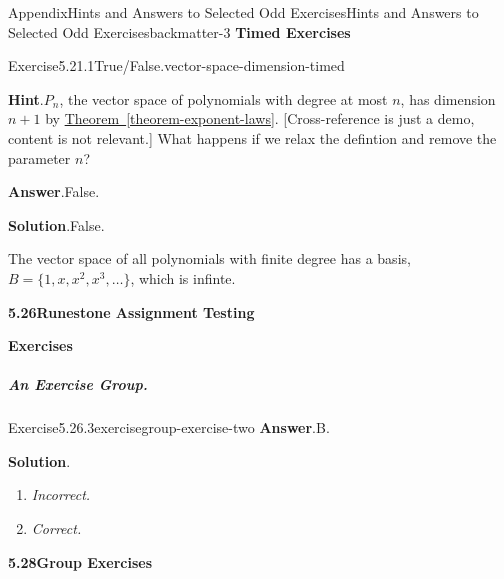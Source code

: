 \documentclass[oneside,10pt,]{book}
\newcommand{\blocktitlefont}{\relax}
\newcommand{\xreffont}{\relax}
\newcommand{\lititle}[1]{{\slshape#1}}
\numberwithin{equation}{section}
\begin{document}
\begin{solutions-chapter}{Appendix}{Hints and Answers to Selected Odd Exercises}{}{Hints and Answers to Selected Odd Exercises}{}{}{backmatter-3}
\noindent\textbf{\large{}\textperiodcentered\space{}Timed Exercises}
\begin{divisionsolution}{Exercise}{5.21.1}{True\slash{}False.}{vector-space-dimension-timed}%
\par\smallskip%
\noindent\textbf{\blocktitlefont Hint}.\hypertarget{vector-space-dimension-timed-4-back}{}\quad{}\(P_n\), the vector space of polynomials with degree at most \(n\), has dimension \(n+1\) by \hyperref[theorem-exponent-laws]{Theorem~{\xreffont\ref{theorem-exponent-laws}}}.  [Cross-reference is just a demo, content is not relevant.]  What happens if we relax the defintion and remove the parameter \(n\)?%
\par\smallskip%
\noindent\textbf{\blocktitlefont Answer}.\hypertarget{vector-space-dimension-timed-5-back}{}\quad{}False.%
\par\smallskip%
\noindent\textbf{\blocktitlefont Solution}.\hypertarget{vector-space-dimension-timed-6-back}{}\quad{}False.%
\par
The vector space of all polynomials with finite degree has a basis, \(B = \{1,x,x^2,x^3,\dots\}\), which is infinte.%
\end{divisionsolution}%
\par\medskip
\noindent\textbf{\Large{}5.26\space\textperiodcentered\space{}Runestone Assignment Testing}
\par\medskip
\noindent\textbf{\large{}\textperiodcentered\space{}Exercises}
\subparagraph[{An Exercise Group}]{An Exercise Group.}
\begin{exercisegroup}
\begin{divisionsolutioneg}{Exercise}{5.26.3}{}{exercisegroup-exercise-two}%
\noindent\textbf{\blocktitlefont Answer}.\hypertarget{exercisegroup-exercise-two-2-back}{}\quad{}B.%
\par\smallskip%
\noindent\textbf{\blocktitlefont Solution}.\hypertarget{exercisegroup-exercise-two-3-back}{}\quad{}%
\begin{enumerate}[label={\Alph*.}]
\item{}\lititle{Incorrect.}\par%
%
\item{}\lititle{Correct.}\par%
%
\end{enumerate}
%
\end{divisionsolutioneg}%
\end{exercisegroup}
\par\medskip\noindent
\par\medskip
\noindent\textbf{\Large{}5.28\space\textperiodcentered\space{}Group Exercises}

\end{solutions-chapter}
\end{document}
